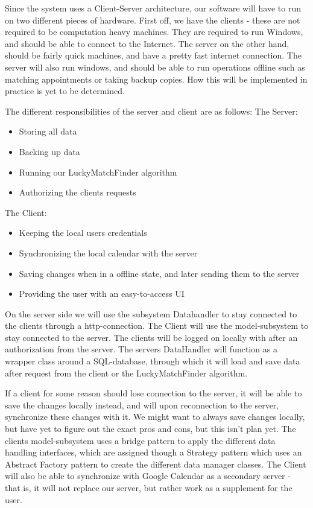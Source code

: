 Since the system uses a Client-Server architecture, our software will have to run on two different pieces of hardware. First off, we have the clients - these are not required to be computation heavy machines. They are required to run Windows, and should be able to connect to the Internet. 
The server on the other hand, should be fairly quick machines, and have a pretty fast internet connection. The server will also run windows, and should be able to run operations offline such as matching appointments or taking backup copies. How this will be implemented in practice is yet to be determined. 


The different responsibilities of the server and client are as follows:
The Server:
\begin{itemize}
	\item Storing all data
	\item Backing up data
	\item Running our LuckyMatchFinder algorithm
	\item Authorizing the clients requests
\end{itemize}
The Client:
\begin{itemize}
	\item Keeping the local users credentials
	\item Synchronizing the local calendar with the server
	\item Saving changes when in a offline state, and later sending them to the server
	\item Providing the user with an easy-to-access UI
\end{itemize}

On the server side we will use the subsystem Datahandler to stay connected to the clients through a http-connection. The Client will use the model-subsystem to stay connected to the server. The clients will be logged on locally with after an authorization from the server.
The servers DataHandler will function as a wrapper class around a SQL-database, through which it will load and save data after request from the client or the LuckyMatchFinder algorithm. 

If a client for some reason should lose connection to the server, it will be able to save the changes locally instead, and will upon reconnection to the server, synchronize these changes with it. We might want to always save changes locally, but have yet to figure out the exact pros and cons, but this isn't plan yet. The clients model-subsystem uses a bridge pattern to apply the different data handling interfaces, which are assigned though a Strategy pattern which uses an Abstract Factory pattern to create the different data manager classes. The Client will also be able to synchronize with Google Calendar as a secondary server - that is, it will not replace our server, but rather work as a supplement for the user. 
